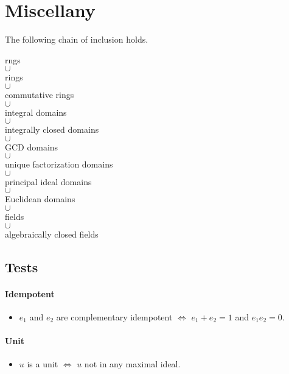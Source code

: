 \documentclass{article}
\begin{document}
\section*{Miscellany}

The following chain of inclusion holds.
\begin{center}
    rngs \\
    $\cup$ \\
    rings \\
    $\cup$  \\
    commutative rings  \\
    $\cup$  \\
    integral domains \\
    $\cup$  \\
    integrally closed domains \\
    $\cup$  \\
    GCD domains \\
    $\cup$  \\
    unique factorization domains \\
    $\cup$  \\
    principal ideal domains \\
    $\cup$  \\
    Euclidean domains \\
    $\cup$  \\
    fields \\
    $\cup$  \\
    algebraically closed fields \\
\end{center}

\subsection*{Tests}

\paragraph*{Idempotent}
\begin{itemize}
    \item $e_1$ and $e_2$ are complementary idempotent $\Leftrightarrow$ $e_1+e_2=1$ and $e_1 e_2 = 0$.
\end{itemize}

\paragraph*{Unit}
\begin{itemize}
    \item $u$ is a unit $\Leftrightarrow$ $u$ not in any maximal ideal.
\end{itemize}
\end{document}
